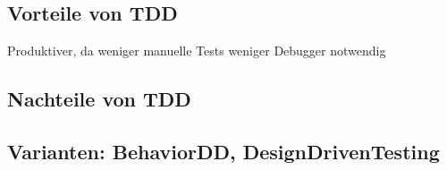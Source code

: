   
  \subsection{Vorteile von TDD}
  Produktiver, 
    da weniger manuelle Tests
    weniger Debugger notwendig
  
  
  
  \subsection{Nachteile von TDD}
  \subsection{Varianten: BehaviorDD, DesignDrivenTesting}